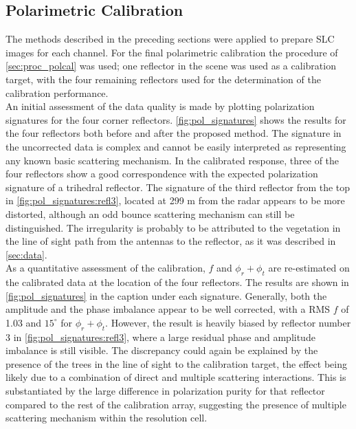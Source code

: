 \subsection{Polarimetric Calibration}\label{sec:res_polcal}
The methods described in the preceding sections were applied to prepare SLC images for each channel. For the final polarimetric calibration the procedure of \autoref{sec:proc_polcal} was used; one reflector in the scene was used as a calibration target, with the four remaining reflectors used for the determination of the calibration performance.\\
An initial assessment of the data quality is made by plotting polarization signatures\cite{VanZyl1987} for the four corner reflectors. \autoref{fig:pol_signatures} shows the results for the four reflectors both before and after the proposed method.
The signature in the uncorrected data is complex and cannot be easily interpreted as representing any known basic scattering mechanism. In the calibrated response, three of the four reflectors show a good correspondence with the expected polarization signature of a trihedral reflector. The signature of the third reflector from the top in \autoref{fig:pol_signatures:refl3}, located at 299 m from the radar appears to be more distorted, although an odd bounce scattering mechanism can still be distinguished. The irregularity is probably to be attributed to the vegetation in the line of sight path from the antennas to the reflector, as it was described in \autoref{sec:data}.\\
As a quantitative assessment of the calibration,  $f$ and $\phi_r + \phi_t$ are re-estimated on the calibrated data at the location of the four reflectors. The results are shown in \autoref{fig:pol_signatures} in the caption under each signature. Generally, both the amplitude and the phase imbalance appear to be well corrected, with a RMS $f$ of 1.03 and $15^\circ$ for $\phi_r + \phi_t$. However, the result is heavily biased by reflector number 3 in \autoref{fig:pol_signatures:refl3}, where a large residual phase and amplitude imbalance is still visible. The discrepancy could again be explained by the presence of the trees in the line of sight to the calibration target, the effect being likely due to a combination of  direct and multiple scattering interactions. This is substantiated by the large difference in polarization purity for that reflector compared to the rest of the calibration array, suggesting the presence of multiple scattering mechanism within the resolution cell.\\
